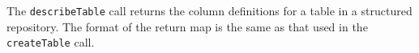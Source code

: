 The \verb+describeTable+ call returns the column definitions for a table in a structured repository. The format
of the return map is the same as that used in the \verb+createTable+ call.
